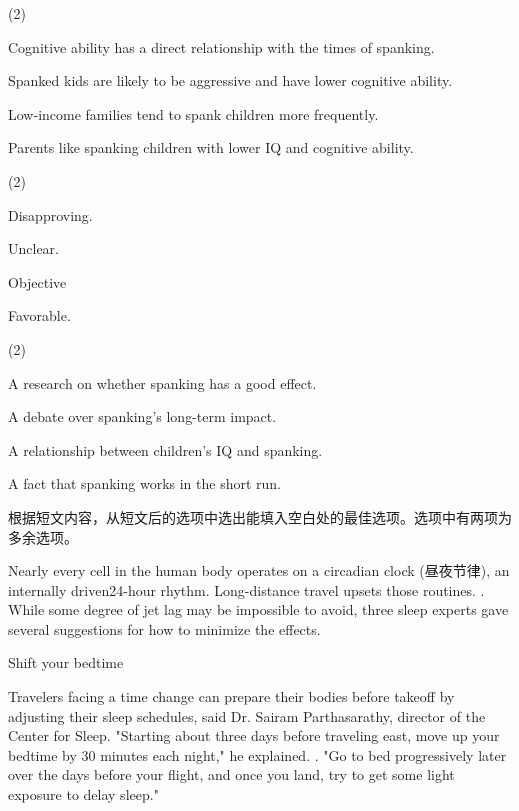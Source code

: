 \documentclass{英语试卷}
\begin{document}
\begin{choices}(2)
  \item Cognitive ability has a direct relationship with the times of spanking.
  \item Spanked kids are likely to be aggressive and have lower cognitive ability.
  \item Low-income families tend to spank children more frequently.
  \item Parents like spanking children with lower IQ and cognitive ability.
\end{choices}
\begin{choices}(2)
  \item Disapproving.
  \item Unclear.
  \item Objective
  \item Favorable.
\end{choices}
\begin{choices}(2)
  \item A research on whether spanking has a good effect.
  \item A debate over spanking's long-term impact.
  \item A relationship between children's IQ and spanking.
  \item A fact that spanking works in the short run.
\end{choices}
\par 根据短文内容，从短文后的选项中选出能填入空白处的最佳选项。选项中有两项为多余选项。\par
\par Nearly every cell in the human body operates on a circadian clock (昼夜节律), an internally driven24-hour rhythm. Long-distance travel upsets those routines. . While some degree of jet lag may be impossible to avoid, three sleep experts gave several suggestions for how to minimize the effects.\par
\par Shift your bedtime\par
\par Travelers facing a time change can prepare their bodies before takeoff by adjusting their sleep schedules, said Dr. Sairam Parthasarathy, director of the Center for Sleep. "Starting about three days before traveling east, move up your bedtime by 30 minutes each night," he explained. . "Go to bed progressively later over the days before your flight, and once you land, try to get some light exposure to delay sleep."\par
\end{document}
